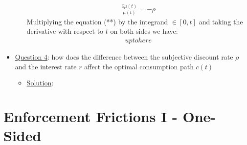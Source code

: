 \documentclass{article}
\begin{document}
\begin{itemize}
\begin{itemize}
        \begin{gather*}
            \frac{\partial \mu(t)}{\mu(t)} = -\rho \tag{**}
        \end{gather*}
        Multiplying the equation (**) by the integrand $\in [0, t]$ and taking the derivative with respect to $t$ on both sides we have:
        \begin{gather*}
            up to here
        \end{gather*}
    \end{itemize}
    \item  \underline{Question 4}: how does the difference between the subjective discount rate $\rho$ and the interest rate $r$ affect the optimal consumption path $c(t)$
    \begin{itemize}
        \item  \underline{Solution}:
    \end{itemize}
\end{itemize}

\newpage

\section{Enforcement Frictions I - One-Sided}
\end{document}
